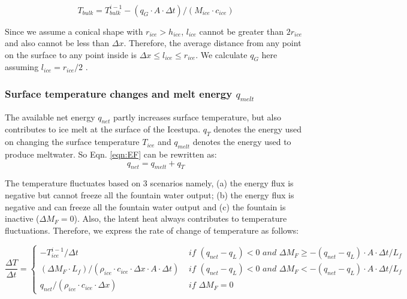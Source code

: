 \documentclass[utf8]{frontiersSCNS} %
\begin{document}
\begin{equation} T_{bulk} = T_{bulk}^{i-1} - (q_{G} \cdot A \cdot \Delta t)/(M_{ice} \cdot c_{ice}) \end{equation}

Since we assume a conical shape with $r_{ice} > h_{ice}$, $l_{ice}$ cannot be greater than $2r_{ice}$ and also cannot be
less than $\Delta x$. Therefore, the average distance from any point on the surface to any point inside is $\Delta x
\leq l_{ice} \leq r_{ice}$. We calculate $q_{G}$ here assuming $l_{ice} = r_{ice}/2$ .

\subsubsection{Surface temperature changes and melt energy $q_{melt}$}

The available net energy $q_{net}$ partly increases surface temperature, but also contributes to ice melt at the surface
of the Icestupa. $q_{T}$ denotes the energy used on changing the surface temperature $T_{ice}$ and $q_{melt}$ denotes
the energy used to produce meltwater. So Eqn. \ref{eqn:EF} can be rewritten as: \begin{equation} q_{net} = q_{melt} +
  q_{T} \end{equation}

The temperature fluctuates based on 3 scenarios namely, (a) the energy flux is negative but cannot freeze all the
fountain water output; (b) the energy flux is negative and can freeze all the fountain water output and (c) the fountain
is inactive ($\Delta M_{F}=0$). Also, the latent heat always contributes to temperature fluctuations. Therefore, we
express the rate of change of temperature as follows:

\begin{equation} \frac{\Delta T}{\Delta t} = \left\{ \begin{array}{ll} -T_{ice}^{i-1}/\Delta t & \textit{ if }
    (q_{net}-q_{L}) < 0 \textit{ and } \Delta M_{F} \geq -(q_{net}-q_{L})\cdot A \cdot \Delta t/L_f  \\ (\Delta M_{F}
    \cdot L_f )/(\rho_{ice} \cdot c_{ice} \cdot  \Delta x \cdot A \cdot \Delta t) & \textit{ if } (q_{net}-q_{L}) < 0
    \textit{ and } \Delta M_{F} < -(q_{net}-q_{L})\cdot A \cdot \Delta t/L_f  \\ q_{net}/ (\rho_{ice}\cdot c_{ice} \cdot
    \Delta x)& \textit{ if } \Delta M_{F} = 0
         
    \end{array} \right.  \label{eqn:T} \end{equation}
\end{document}
